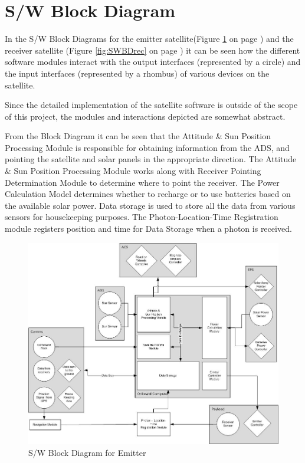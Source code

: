 \section{S/W Block Diagram}
\label{section_SWBD}

In the S/W Block Diagrams for the emitter satellite(Figure \ref{fig:SWBDemit} on page \pageref{fig:SWBDemit}) and the receiver satellite (Figure \ref{fig:SWBDrec} on page \pageref{fig:SWBDrec}) it can be seen how the different software modules interact with the output interfaces (represented by a circle) and the input interfaces (represented by a rhombus) of various devices on the satellite. 
 
Since the detailed implementation of the satellite software is outside of the scope of this project, the modules and interactions depicted are somewhat abstract.  

From the Block Diagram it can be seen that the Attitude \& Sun Position Processing Module is responsible for obtaining information from the \ac{ADS}, and pointing the satellite and solar panels in the appropriate direction. The Attitude \& Sun Position Processing Module works along with Receiver Pointing Determination Module to determine where to point the receiver. The Power Calculation Model determines whether to recharge or to use batteries based on the available solar power. Data storage is used to store all the data from various sensors for housekeeping purposes. The Photon-Location-Time Registration module registers position and time for Data Storage when a photon is received.

\begin{landscape}
\begin{figure}[ht!]
\centering
\includegraphics[width=1\textheight]{chapters/img/SWBDemit.jpg}
\caption{S/W Block Diagram for Emitter }
\label{fig:SWBDemit}
\end{figure}
\end{landscape}

